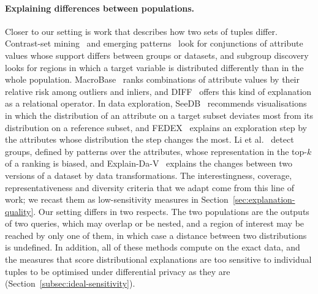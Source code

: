 \paragraph{Explaining differences between populations.}
Closer to our setting is work that describes how two sets of tuples differ.
Contrast-set mining~\cite{BayPazzani01} and emerging patterns~\cite{DongLi99} look for conjunctions of attribute values whose support differs between groups or datasets, and subgroup discovery~\cite{Wrobel97,HerreraCGJ11} looks for regions in which a target variable is distributed differently than in the whole population.
MacroBase~\cite{MacroBase} ranks combinations of attribute values by their relative risk among outliers and inliers, and DIFF~\cite{DIFF} offers this kind of explanation as a relational operator.
In data exploration, SeeDB~\cite{SeeDB} recommends visualisations in which the distribution of an attribute on a target subset deviates most from its distribution on a reference subset, and FEDEX~\cite{FEDEX} explains an exploration step by the attributes whose distribution the step changes the most.
Li et al.~\cite{ICDE23} detect groups, defined by patterns over the attributes, whose representation in the top-$k$ of a ranking is biased, and Explain-Da-V~\cite{ShragaM23} explains the changes between two versions of a dataset by data transformations.
The interestingness, coverage, representativeness and diversity criteria that we adapt come from this line of work; we recast them as low-sensitivity measures in Section~\ref{sec:explanation-quality}.
Our setting differs in two respects.
The two populations are the outputs of two queries, which may overlap or be nested, and a region of interest may be reached by only one of them, in which case a distance between two distributions is undefined.
In addition, all of these methods compute on the exact data, and the measures that score distributional explanations are too sensitive to individual tuples to be optimised under differential privacy as they are (Section~\ref{subsec:ideal-sensitivity}).

